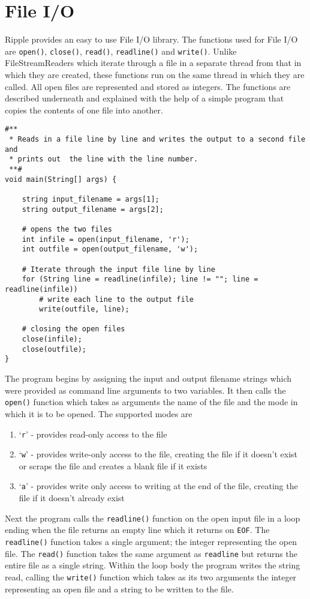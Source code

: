 \documentclass{article}
\newcommand{\code}{\texttt}
\begin{document}
\section{File I/O}
Ripple provides an easy to use File I/O library. The functions used for File I/O are \code{open()}, \code{close()}, \code{read()}, \code{readline()} and \code{write()}. Unlike FileStreamReaders which iterate through a file in a separate thread from that in which they are created, these functions run on the same thread in which they are called. All open files are  represented and stored as integers. The functions are described underneath and explained with the help of a simple program that copies the contents of one file into another.

\begin{lstlisting}[title=\emph{count.rpl}]
#**
 * Reads in a file line by line and writes the output to a second file and 
 * prints out  the line with the line number. 
 **#
void main(String[] args) {
    
    string input_filename = args[1];
    string output_filename = args[2];
    
    # opens the two files
    int infile = open(input_filename, 'r');
    int outfile = open(output_filename, 'w');
    
    # Iterate through the input file line by line
    for (String line = readline(infile); line != ""; line = readline(infile)) 
        # write each line to the output file
        write(outfile, line);
         
    # closing the open files
    close(infile);
    close(outfile);
}
\end{lstlisting}

The program begins by assigning the input and output filename strings which were provided as command line arguments to two variables. It then calls the \code{open()} function which takes as arguments the name of the file and the mode in which it is to be opened. The supported modes are
\begin{enumerate}
\item `\code{r}' - provides read-only access to the file
\item `\code{w}' - provides write-only access to the file, creating the file if it doesn't exist or scraps the file and creates a blank file if it exists
\item `\code{a}' - provides write only access to writing at the end of the file, creating the file if it doesn't already exist
\end{enumerate}
Next the program calls the \code{readline()} function on the open input file in a loop ending when the file returns an empty line which it returns on \code{EOF}. The \code{readline()} function takes a single argument; the integer representing the open file. The \code{read()} function takes the same argument as \code{readline} but returns the entire file as a single string. Within the loop body the program writes the string read, calling the \code{write()} function which takes as its two arguments the integer representing an open file and a string to be written to the file.
\end{document}
